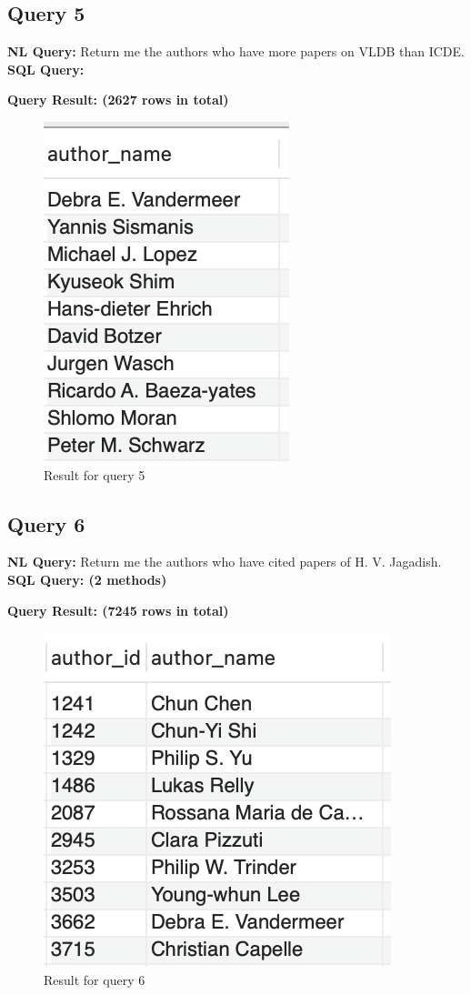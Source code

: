 \documentclass{article}
\begin{document}
\subsection{Query 5}
\textbf{NL Query:} Return me the authors who have more papers on VLDB than ICDE.
\vspace{6 pt}
\\
\textbf{SQL Query:}

\textbf{Query Result: (2627 rows in total)}
\begin{figure}[h]
	\centering
	\includegraphics[width=.15\textheight]{figures/q5_res.png}
	\caption{Result for query 5}
	\label{fig:006}
\end{figure}
\subsection{Query 6}
\textbf{NL Query:} Return me the authors who have cited papers of H. V. Jagadish.
\vspace{6 pt}
\\
\textbf{SQL Query: (2 methods)}

\textbf{Query Result: (7245 rows in total)}
\begin{figure}[h]
	\centering
	\includegraphics[width=.17\textheight]{figures/q6_res.png}
	\caption{Result for query 6}
	\label{fig:007}
\end{figure}
\end{document}
